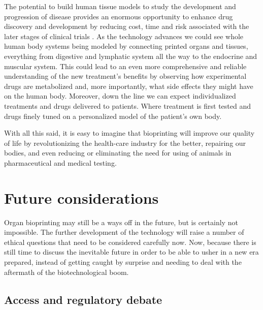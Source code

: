 \documentclass[12pt]{article} %
\begin{document}
The potential to build human tissue models to study the development and progression of disease provides an enormous opportunity to enhance drug discovery and development by reducing cost, time and risk associated with the later stages of clinical trials \cite{Visk:2015}. As the technology advances we could see whole human body systems being modeled by connecting printed organs and tissues, everything from digestive and lymphatic system all the way to the endocrine and muscular system. This could lead to an even more comprehensive and reliable understanding of the new treatment's benefits by observing how experimental drugs are metabolized and, more importantly, what side effects they might have on the human body. Moreover, down the line we can expect individualized treatments and drugs delivered to patients. Where treatment is first tested and drugs finely tuned on a personalized model of the patient's own body. 

With all this said, it is easy to imagine that bioprinting will improve our quality of life by revolutionizing the health-care industry for the better, repairing our bodies, and even reducing or eliminating the need for using of animals in pharmaceutical and medical testing.

\newpage 


\section{Future considerations} %

Organ bioprinting may still be a ways off in the future, but is certainly not impossible. The further development of the technology will raise a number of ethical questions that need to be considered carefully now. Now, because there is still time to discuss the inevitable future in order to be able to usher in a new era prepared, instead of getting caught by surprise and needing to deal with the aftermath of the biotechnological boom. 


\subsection{Access and regulatory debate} %
\end{document}
